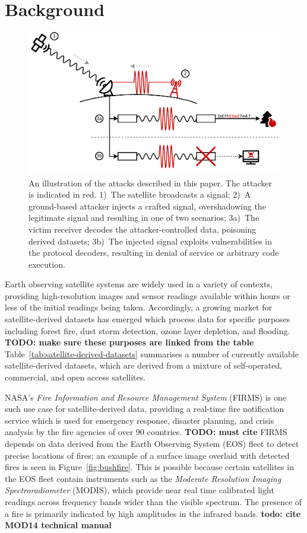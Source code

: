 \section{Background}\label{sec:background}
\begin{figure}
    \centering
    \includegraphics[width=\columnwidth]{diagrams/attack_illustration.pdf}
    \caption{An illustration of the attacks described in this paper. The attacker is indicated in red. 1)~The satellite broadcasts a signal; 2)~A ground-based attacker injects a crafted signal, overshadowing the legitimate signal and resulting in one of two scenarios; 3a)~The victim receiver decodes the attacker-controlled data, poisoning derived datasets; 3b)~The injected signal exploits vulnerabilities in the protocol decoders, resulting in denial of service or arbitrary code execution.}
    \label{fig:attack-illustration}
\end{figure}

Earth observing satellite systems are widely used in a variety of contexts, providing high-resolution images and sensor readings available within hours or less of the initial readings being taken.
Accordingly, a growing market for satellite-derived datasets has emerged which process data for specific purposes including forest fire, dust storm detection, ozone layer depletion, and flooding. \textbf{TODO: make sure these purposes are linked from the table}
Table~\ref{tab:satellite-derived-datasets} summarises a number of currently available satellite-derived datasets, which are derived from a mixture of self-operated, commercial, and open access satellites.

NASA's \textit{Fire Information and Resource Management System} (FIRMS) is one such use case for satellite-derived data, providing a real-time fire notification service which is used for emergency response, disaster planning, and crisis analysis by the fire agencies of over 90 countries. \textbf{TODO: must cite}
FIRMS depends on data derived from the Earth Observing System (EOS) fleet to detect precise locations of fires; an example of a surface image overlaid with detected fires is seen in Figure~\ref{fig:bushfire}.
This is possible because certain satellites in the EOS fleet contain instruments such as the \textit{Moderate Resolution Imaging Spectroradiometer} (MODIS), which provide near real time calibrated light readings across frequency bands wider than the visible spectrum.
The presence of a fire is primarily indicated by high amplitudes in the infrared bands. \textbf{todo: cite MOD14 technical manual}

